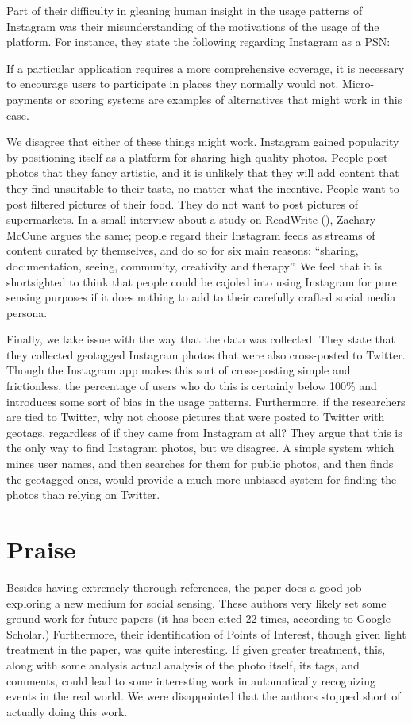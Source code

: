 \documentclass[a4paper]{article}
\begin{document}
Part of their difficulty in gleaning human insight in the usage patterns of
Instagram was their misunderstanding of the motivations of the usage of the
platform. For instance, they state the following regarding Instagram as a PSN:
\begin{displayquote}
    If a particular application requires a more comprehensive coverage, it is
    necessary to encourage users to participate in places they normally would
    not. Micro- payments or scoring systems are examples of alternatives that
    might work in this case.
\end{displayquote}
We disagree that either of these things might work. Instagram gained popularity
by positioning itself as a platform for sharing high quality photos. People post
photos that they fancy artistic, and it is unlikely that they will add content
that they find unsuitable to their taste, no matter what the incentive. People
want to post filtered pictures of their food. They do not want to post pictures
of supermarkets. In a small interview about a study on ReadWrite
(\texttt{\scriptsize{}}), Zachary
McCune argues the same; people regard their Instagram feeds as streams of
content curated by themselves, and do so for six main reasons: ``sharing,
documentation, seeing, community, creativity and therapy''. We feel that it is
shortsighted to think that people could be cajoled into using Instagram for pure
sensing purposes if it does nothing to add to their carefully crafted social
media persona.

Finally, we take issue with the way that the data was collected. They state that
they collected geotagged Instagram photos that were also cross-posted to
Twitter. Though the Instagram app makes this sort of cross-posting simple and
frictionless, the percentage of users who do this is certainly below 100\% and
introduces some sort of bias in the usage patterns. Furthermore, if the
researchers are tied to Twitter, why not choose pictures that were posted to
Twitter with geotags, regardless of if they came from Instagram at all? They
argue that this is the only way to find Instagram photos, but we disagree. A
simple system which mines user names, and then searches for them for public
photos, and then finds the geotagged ones, would provide a much more unbiased
system for finding the photos than relying on Twitter.

\section{Praise}

Besides having extremely thorough references, the paper does a good job
exploring a new medium for social sensing. These authors very likely set some
ground work for future papers (it has been cited 22 times, according to Google
Scholar.) Furthermore, their identification of Points of Interest, though given
light treatment in the paper, was quite interesting. If given greater treatment,
this, along with some analysis actual analysis of the photo itself, its tags,
and comments, could lead to some interesting work in automatically recognizing
events in the real world. We were disappointed that the authors stopped short of
actually doing this work.
\end{document}

